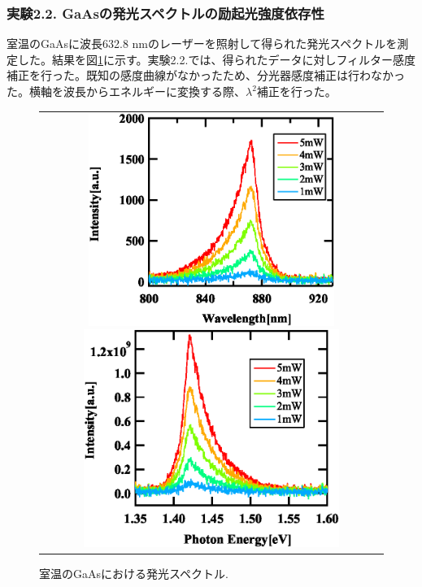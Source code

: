 \documentclass[11pt,a4j]{jsarticle}
\begin{document}
\subsubsection{実験2.2. GaAsの発光スペクトルの励起光強度依存性}

室温のGaAsに波長632.8 nmのレーザーを照射して得られた発光スペクトルを測定した。結果を図\ref{fig_gaas_rt_spec1}に示す。実験2.2.では、得られたデータに対しフィルター感度補正を行った。既知の感度曲線がなかったため、分光器感度補正は行わなかった。横軸を波長からエネルギーに変換する際、$\lambda^2$補正を行った。

\begin{figure}[ht]
 \centering
 \begin{tabular}{c}

  \begin{minipage}{0.5\hsize}

   \includegraphics[clip,width=8cm]{start2_GaAs_rt_Spectrum_wav.eps}
  \end{minipage}

  \begin{minipage}{0.06\hsize}%
   \hspace{1mm}
  \end{minipage}

  \begin{minipage}{0.5\hsize}
   \centering
   \includegraphics[clip,width=8.3cm]{start2_GaAs_rt_Spectrum_eV.eps}
  \end{minipage}
 \end{tabular}
 \caption{室温のGaAsにおける発光スペクトル.}
 \label{fig_gaas_rt_spec1}

\end{figure}
\end{document}
